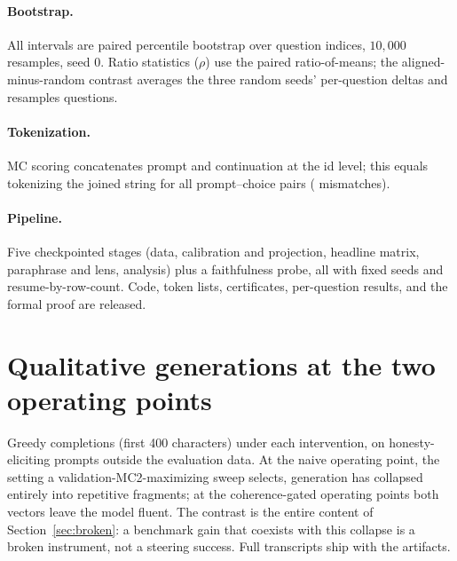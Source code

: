 \paragraph{Bootstrap.} All intervals are paired percentile bootstrap over question indices, $10{,}000$ resamples, seed $0$. Ratio statistics ($\rho$) use the paired ratio-of-means; the aligned-minus-random contrast averages the three random seeds' per-question deltas and resamples questions.

\paragraph{Tokenization.} MC scoring concatenates prompt and continuation at the id level; this equals tokenizing the joined string for all \BpePairs{} prompt--choice pairs (\BpeMismatches{} mismatches).

\paragraph{Pipeline.} Five checkpointed stages (data, calibration and projection, headline matrix, paraphrase and lens, analysis) plus a faithfulness probe, all with fixed seeds and resume-by-row-count. Code, token lists, certificates, per-question results, and the formal proof are released.

\section{Qualitative generations at the two operating points}\label{app:generations}

Greedy completions (first 400 characters) under each intervention, on honesty-eliciting prompts outside the evaluation data. At the naive operating point, the setting a validation-MC2-maximizing sweep selects, generation has collapsed entirely into repetitive fragments; at the coherence-gated operating points both vectors leave the model fluent. The contrast is the entire content of Section~\ref{sec:broken}: a benchmark gain that coexists with this collapse is a broken instrument, not a steering success. Full transcripts ship with the artifacts.


